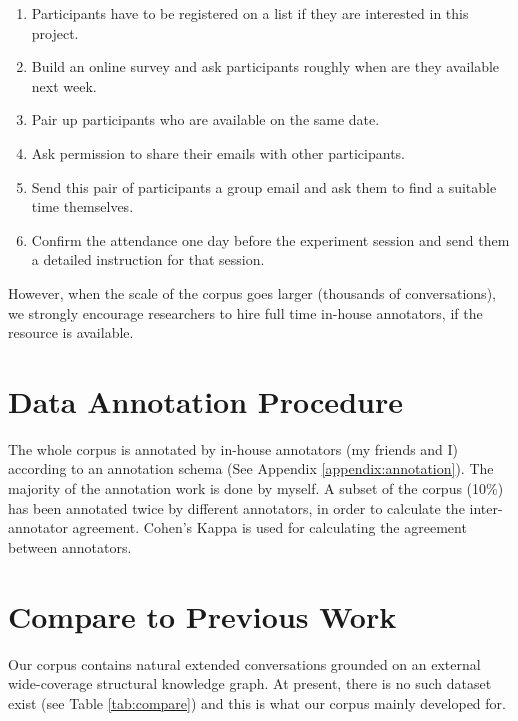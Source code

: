 \documentclass[bsc,frontabs,twoside,singlespacing,parskip,deptreport]{infthesis}     %
\begin{document}
\begin{enumerate}

    \item Participants have to be registered on a list if they are interested in this project.

   \item Build an online survey and ask participants roughly when are they available next week.

   \item Pair up participants who are available on the same date.
 
   \item Ask permission to share their emails with other participants.
   
    \item Send this pair of participants a group email and ask them to find a suitable time themselves.

    \item Confirm the attendance one day before the experiment session and send them a detailed instruction for that session.
    
\end{enumerate}

However, when the scale of the corpus goes larger (thousands of conversations), we strongly encourage researchers to hire full time in-house annotators, if the resource is available.

\section{Data Annotation Procedure}

The whole corpus is annotated by in-house annotators (my friends and I) according to an annotation schema (See Appendix \ref{appendix:annotation}). The majority of the annotation work is done by myself. A subset of the corpus (10\%) has been annotated twice by different annotators, in order to calculate the inter-annotator agreement. Cohen's Kappa is used for calculating the agreement between annotators.

\section{Compare to Previous Work}

Our corpus contains natural extended conversations grounded on an external wide-coverage structural knowledge graph. At present, there is no such dataset exist (see Table \ref{tab:compare}) and this is what our corpus mainly developed for.
\end{document}
